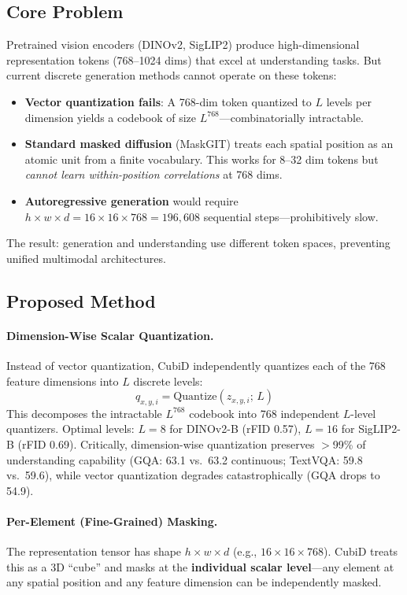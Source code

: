 \documentclass[11pt]{article}
\begin{document}
\subsection{Core Problem}

Pretrained vision encoders (DINOv2, SigLIP2) produce high-dimensional representation tokens (768--1024 dims) that excel at understanding tasks.
But current discrete generation methods cannot operate on these tokens:
\begin{itemize}
    \item \textbf{Vector quantization fails}: A 768-dim token quantized to $L$ levels per dimension yields a codebook of size $L^{768}$---combinatorially intractable.
    \item \textbf{Standard masked diffusion} (MaskGIT) treats each spatial position as an atomic unit from a finite vocabulary. This works for 8--32 dim tokens but \emph{cannot learn within-position correlations} at 768 dims.
    \item \textbf{Autoregressive generation} would require $h \times w \times d = 16 \times 16 \times 768 = 196{,}608$ sequential steps---prohibitively slow.
\end{itemize}

The result: generation and understanding use different token spaces, preventing unified multimodal architectures.

\subsection{Proposed Method}

\paragraph{Dimension-Wise Scalar Quantization.}
Instead of vector quantization, CubiD independently quantizes each of the 768 feature dimensions into $L$ discrete levels:
\[
q_{x,y,i} = \mathrm{Quantize}(z_{x,y,i};\, L)
\]
This decomposes the intractable $L^{768}$ codebook into 768 independent $L$-level quantizers.
Optimal levels: $L\!=\!8$ for DINOv2-B (rFID 0.57), $L\!=\!16$ for SigLIP2-B (rFID 0.69).
Critically, dimension-wise quantization preserves $>$99\% of understanding capability (GQA: 63.1 vs.\ 63.2 continuous; TextVQA: 59.8 vs.\ 59.6), while vector quantization degrades catastrophically (GQA drops to 54.9).

\paragraph{Per-Element (Fine-Grained) Masking.}
The representation tensor has shape $h \times w \times d$ (e.g., $16 \times 16 \times 768$).
CubiD treats this as a 3D ``cube'' and masks at the \textbf{individual scalar level}---any element at any spatial position and any feature dimension can be independently masked.
\end{document}
